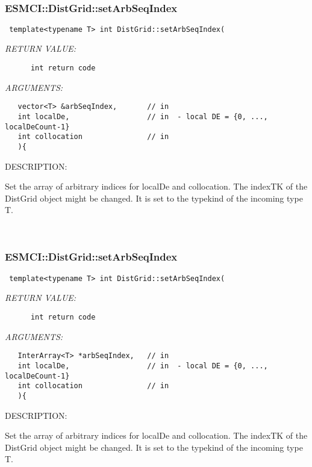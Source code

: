 \mbox{}\hrulefill\
 
\subsubsection [ESMCI::DistGrid::setArbSeqIndex] {ESMCI::DistGrid::setArbSeqIndex}


  
\begin{verbatim} template<typename T> int DistGrid::setArbSeqIndex(\end{verbatim}{\em RETURN VALUE:}
\begin{verbatim}      int return code\end{verbatim}{\em ARGUMENTS:}
\begin{verbatim}   vector<T> &arbSeqIndex,       // in
   int localDe,                  // in  - local DE = {0, ..., localDeCount-1}
   int collocation               // in
   ){\end{verbatim}
{\sf DESCRIPTION:\\ }


      Set the array of arbitrary indices for localDe and collocation. The 
      indexTK of the DistGrid object might be changed. It is set to the 
      typekind of the incoming type T.
   
 
\mbox{}\hrulefill\
 
\subsubsection [ESMCI::DistGrid::setArbSeqIndex] {ESMCI::DistGrid::setArbSeqIndex}


  
\begin{verbatim} template<typename T> int DistGrid::setArbSeqIndex(\end{verbatim}{\em RETURN VALUE:}
\begin{verbatim}      int return code\end{verbatim}{\em ARGUMENTS:}
\begin{verbatim}   InterArray<T> *arbSeqIndex,   // in
   int localDe,                  // in  - local DE = {0, ..., localDeCount-1}
   int collocation               // in
   ){\end{verbatim}
{\sf DESCRIPTION:\\ }


      Set the array of arbitrary indices for localDe and collocation. The 
      indexTK of the DistGrid object might be changed. It is set to the 
      typekind of the incoming type T.
   
